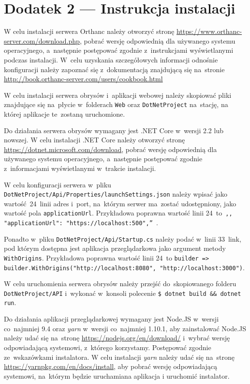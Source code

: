 \documentclass[a4paper,11pt,twoside,openright]{report}
\theoremstyle{definition}
\begin{document}
\chapter*{Dodatek 2 --- Instrukcja instalacji}

W celu instalacji serwera Orthanc należy otworzyć stronę
\url{https://www.orthanc-server.com/download.php}, pobrać wersję odpowiednią dla
używanego systemu operacyjnego, a~następnie postępować zgodnie z~instrukcjami
wyświetlanymi podczas instalacji. W~celu uzyskania szczegółowych informacji
odnośnie konfiguracji należy zapoznać się z~dokumentacją znajdującą się na~stronie
\url{http://book.orthanc-server.com/users/cookbook.html}

W celu instalacji serwera obrysów i~aplikacji webowej należy skopiować pliki
znajdujące się na~płycie w~folderach \texttt{Web} oraz \texttt{DotNetProject} na~stację,
na której aplikacje te~zostaną uruchomione.

Do działania serwera obrysów wymagany jest .NET Core w~wersji 2.2 lub nowszej.
W celu instalacji .NET Core należy otworzyć stronę \url{https://dotnet.microsoft.com/download},
pobrać wersję odpowiednią dla używanego systemu operacyjnego, a~następnie
postępować zgodnie z~informacjami wyświetlanymi w~trakcie instalacji.

W celu konfiguracji serwera w~pliku \texttt{DotNetProject/Api/Properties/launchSettings.json}
należy wpisać jako wartość~24~linii adres i~port, na~którym serwer ma~zostać
udostępniony, jako wartość pola \texttt{applicationUrl}. Przykładowa poprawna wartość
linii 24~to\texttt{ ,, "applicationUrl": "https://localhost:500",'' }.

Ponadto w~pliku \texttt{DotNetProject/Api/Startup.cs} należy podać w~linii 33~link, pod
którym dostępna jest aplikacja przeglądarkowa jako argument metody \texttt{WithOrigins}.
Przykładowa poprawna wartość linii 24~to
\texttt{builder => builder.WithOrigins("http://localhost:8080", "http://localhost:3000")}.

W celu uruchomienia serwera obrysów należy przejść do~skopiowanego folderu
\texttt{DotNetProject/API} i~wykonać w~konsoli polecenie \texttt{\$ dotnet build \&\& dotnet run}.

Do działania aplikacji przeglądarkowej wymagany jest Node.JS w~wersji co~najmniej
9.4 oraz \textit{yarn} w~wersji co~najmniej 1.10.1, aby zainstalować Node.JS należy udać
się na~stronę \url{https://nodejs.org/en/download/} i~wybrać wersję odpowiadającą
systemowi, z~którego korzystamy. Postępować zgodnie ze~wskazówkami instalatora.
W celu instalacji \textit{yarn} należy udać się na~stronę \url{https://yarnpkg.com/en/docs/install},
aby pobrać wersję odpowiadającą systemowi, na~którym będzie uruchamiana aplikacja
i uruchomić instalator.
\end{document}
